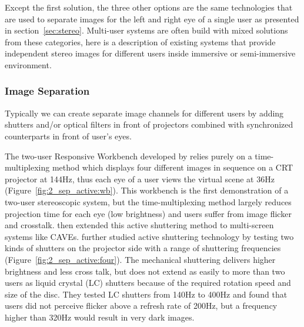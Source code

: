 Except the first solution, the three other options are the same technologies that are used to separate images for the left and right eye of a single user as presented in section~\ref{sec:stereo}. Multi-user systems are often build with mixed solutions from these categories, here is a description of existing systems that provide independent stereo images for different users inside immersive or semi-immersive environment.


\subsubsection{Image Separation} 
Typically we can create separate image channels for different users by adding shutters and/or optical filters in front of projectors combined with synchronized counterparts in front of user's eyes.

The two-user Responsive Workbench developed by \citet{Agrawala1997TRW} relies purely on a time-multiplexing method which displays four different images in sequence on a CRT projector at 144Hz, thus each eye of a user views the virtual scene at 36Hz (Figure~\ref{fig:2_sep_active:wb}). This workbench is the first demonstration of a two-user stereoscopic system, but the time-multiplexing method largely reduces projection time for each eye (low brightness) and users suffer from image flicker and crosstalk. \citet{Blom2002Multiple} then extended this active shuttering method to multi-screen systems like CAVEs. \citep{Froehlich2004Implementing} further studied active shuttering technology by testing two kinds of shutters on the projector side with a range of shuttering frequencies (Figure~\ref{fig:2_sep_active:four}). The mechanical shuttering delivers higher brightness and less cross talk, but does not extend as easily to more than two users as liquid crystal (LC) shutters because of the required rotation speed and size of the disc. They tested LC shutters from 140Hz to 400Hz and found that users did not perceive flicker above a refresh rate of 200Hz, but a frequency higher than 320Hz would result in very dark images.

